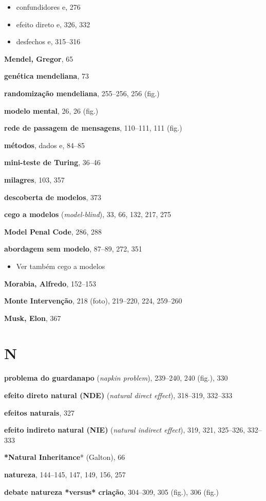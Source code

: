 \documentclass[11pt,a5paper,twoside]{book}
\begin{document}
\begin{itemize}
\item confundidores e, 276
\item efeito direto e, 326, 332
\item desfechos e, 315–316
\end{itemize}
\textbf{Mendel, Gregor}, 65

\textbf{genética mendeliana}, 73

\textbf{randomização mendeliana}, 255–256, 256 (fig.)

\textbf{modelo mental}, 26, 26 (fig.)

\textbf{rede de passagem de mensagens}, 110–111, 111 (fig.)

\textbf{métodos}, dados e, 84–85

\textbf{mini-teste de Turing}, 36–46

\textbf{milagres}, 103, 357

\textbf{descoberta de modelos}, 373

\textbf{cego a modelos} (\textit{model-blind}), 33, 66, 132, 217, 275

\textbf{Model Penal Code}, 286, 288

\textbf{abordagem sem modelo}, 87–89, 272, 351

\begin{itemize}
\item Ver também cego a modelos
\end{itemize}
\textbf{Morabia, Alfredo}, 152–153

\textbf{Monte Intervenção}, 218 (foto), 219–220, 224, 259–260

\textbf{Musk, Elon}, 367

\section{N}
\textbf{problema do guardanapo} (\textit{napkin problem}), 239–240, 240 (fig.), 330

\textbf{efeito direto natural (NDE)} (\textit{natural direct effect}), 318–319, 332–333

\textbf{efeitos naturais}, 327

\textbf{efeito indireto natural (NIE)} (\textit{natural indirect effect}), 319, 321, 325–326, 332–333

\textbf{*Natural Inheritance}* (Galton), 66

\textbf{natureza}, 144–145, 147, 149, 156, 257

\textbf{debate natureza *versus* criação}, 304–309, 305 (fig.), 306 (fig.)
\end{document}
